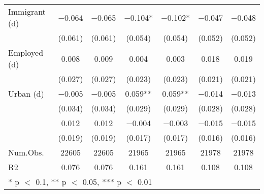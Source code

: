 \begin{table}
\begin{tabular}[t]{lcccccc}
Immigrant (d) & \num{-0.064} & \num{-0.065} & \num{-0.104}* & \num{-0.102}* & \num{-0.047} & \num{-0.048}\\
 & (\num{0.061}) & (\num{0.061}) & (\num{0.054}) & (\num{0.054}) & (\num{0.052}) & (\num{0.052})\\
Employed (d) & \num{0.008} & \num{0.009} & \num{0.004} & \num{0.003} & \num{0.018} & \num{0.019}\\
 & (\num{0.027}) & (\num{0.027}) & (\num{0.023}) & (\num{0.023}) & (\num{0.021}) & (\num{0.021})\\
Urban (d) & \num{-0.005} & \num{-0.005} & \num{0.059}** & \num{0.059}** & \num{-0.014} & \num{-0.013}\\
 & (\num{0.034}) & (\num{0.034}) & (\num{0.029}) & (\num{0.029}) & (\num{0.028}) & (\num{0.028})\\
 & \num{0.012} & \num{0.012} & \num{-0.004} & \num{-0.003} & \num{-0.015} & \num{-0.015}\\
 & (\num{0.019}) & (\num{0.019}) & (\num{0.017}) & (\num{0.017}) & (\num{0.016}) & (\num{0.016})\\
\midrule
Num.Obs. & \num{22605} & \num{22605} & \num{21965} & \num{21965} & \num{21978} & \num{21978}\\
R2 & \num{0.076} & \num{0.076} & \num{0.161} & \num{0.161} & \num{0.108} & \num{0.108}\\
\bottomrule
\multicolumn{7}{l}{\rule{0pt}{1em}* p $<$ 0.1, ** p $<$ 0.05, *** p $<$ 0.01}\\
\end{tabular}
\end{table}